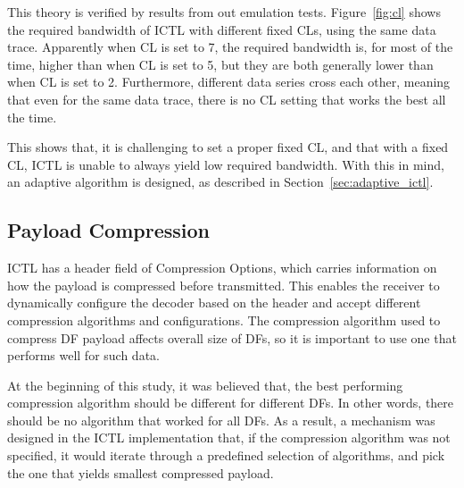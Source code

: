 \documentclass[12pt]{report}
\begin{document}
This theory is verified by results from out emulation tests. Figure~\ref{fig:cl} shows the required bandwidth of ICTL with different fixed CLs, using the same data trace. Apparently when CL is set to 7, the required bandwidth is, for most of the time, higher than when CL is set to 5, but they are both generally lower than when CL is set to 2. Furthermore, different data series cross each other, meaning that even for the same data trace, there is no CL setting that works the best all the time.

This shows that, it is challenging to set a proper fixed CL, and that with a fixed CL, ICTL is unable to always yield low required bandwidth. With this in mind, an adaptive algorithm is designed, as described in Section~\ref{sec:adaptive_ictl}.

\subsection{Payload Compression}
\label{sec:payload_compression}

ICTL has a header field of Compression Options, which carries information on how the payload is compressed before transmitted. This enables the receiver to dynamically configure the decoder based on the header and accept different compression algorithms and configurations. The compression algorithm used to compress DF payload affects overall size of DFs, so it is important to use one that performs well for such data.

At the beginning of this study, it was believed that, the best performing compression algorithm should be different for different DFs. In other words, there should be no algorithm that worked for all DFs. As a result, a mechanism was designed in the ICTL implementation that, if the compression algorithm was not specified, it would iterate through a predefined selection of algorithms, and pick the one that yields smallest compressed payload.
\end{document}
